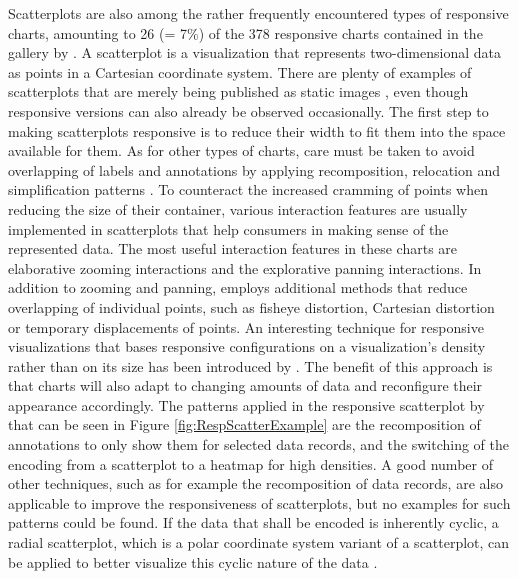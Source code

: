 Scatterplots are also among the rather frequently encountered types of responsive charts, amounting to 26 (= 7\%) of the 378 responsive charts contained in the gallery by \cite{DesignPatternsTradeOffsRespVis}. A scatterplot is a visualization that represents two-dimensional data as points in a Cartesian coordinate system. There are plenty of examples of scatterplots that are merely being published as static images \parencite{Scatter,Scatter2}, even though responsive versions can also already be observed occasionally. The first step to making scatterplots responsive is to reduce their width to fit them into the space available for them. As for other types of charts, care must be taken to avoid overlapping of labels and annotations by applying recomposition, relocation and simplification patterns \parencite{RespScatter,RespScatter2}. To counteract the increased cramming of points when reducing the size of their container, various interaction features are usually implemented in scatterplots that help consumers in making sense of the represented data. The most useful interaction features in these charts are elaborative zooming interactions and the explorative panning interactions. In addition to zooming and panning, \cite{RespVis} employs additional methods that reduce overlapping of individual points, such as fisheye distortion, Cartesian distortion or temporary displacements of points. An interesting technique for responsive visualizations that bases responsive configurations on a visualization's density rather than on its size has been introduced by \cite{NickRabinowitzRDV}. The benefit of this approach is that charts will also adapt to changing amounts of data and reconfigure their appearance accordingly. The patterns applied in the responsive scatterplot by \cite{NickRabinowitzRDV} that can be seen in Figure \ref{fig:RespScatterExample} are the recomposition of annotations to only show them for selected data records, and the switching of the encoding from a scatterplot to a heatmap for high densities. A good number of other techniques, such as for example the recomposition of data records, are also applicable to improve the responsiveness of scatterplots, but no examples for such patterns could be found. If the data that shall be encoded is inherently cyclic, a radial scatterplot, which is a polar coordinate system variant of a scatterplot, can be applied to better visualize this cyclic nature of the data \parencite{RespRadialScatterHLine}. 

